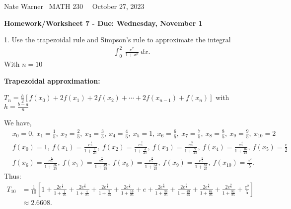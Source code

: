 \documentclass{report}
\title{\Huge{}}
\author{\huge{Nathan Warner}}
\date{\huge{}}
\begin{document}
    \pagebreak \bigbreak \noindent
    Nate Warner \ \quad \quad \quad \quad \quad \quad \quad \quad \quad \quad \quad \quad \quad \quad \quad \quad \quad  MATH 230 \quad  \quad \quad \quad \quad \quad \quad \quad \quad \ \ \quad \quad October 27, 2023
    \begin{center}
        \textbf{Homework/Worksheet 7 - Due: Wednesday, November 1}
    \end{center}
    \bigbreak \noindent 
    \begin{mdframed}
        1.  Use the trapezoidal rule and Simpson’s rule to approximate the integral
        \begin{align*}
            &\int_{0}^{2}\ \frac{e^{x}}{1+x^{2}}\ dx 
        .\end{align*}
        With $n=10$
    \end{mdframed}
    \bigbreak \noindent 
    \textbf{Trapezoidal approximation:}
    \begin{remark}
        $T_{n} = \frac{h}{2}\left[f(x_{0}) + 2f(x_{1}) + 2f(x_{2}) + \cdots + 2f(x_{n-1}) + f(x_{n})\right] $ with $h = \frac{b-a}{n}$
    \end{remark}
    \bigbreak \noindent 
    We have,
    \begin{align*}
        &x_{0} = 0,\ x_{1} = \frac{1}{5},\ x_{2}=\frac{2}{5},\ x_{3} = \frac{3}{5},\ x_{4} = \frac{4}{5},\ x_{5} = 1,\ x_{6} = \frac{6}{5},\ x_{7} = \frac{7}{5},\ x_{8} = \frac{8}{5},\ x_{9} = \frac{9}{5},\ x_{10} = 2 \\
        &f(x_{0}) = 1,\ f(x_{1}) = \frac{e^{\frac{1}{5}}}{1+\frac{1}{25}},\ f(x_{2}) = \frac{e^{\frac{2}{5}}}{1+\frac{4}{25}},\ f(x_{3}) = \frac{e^{\frac{3}{5}}}{1+\frac{9}{25}},\ f(x_{4}) = \frac{e^{\frac{4}{5}}}{1+\frac{16}{25}},\ f(x_{5}) = \frac{e}{2} \\
        &f(x_{6}) = \frac{e^{\frac{6}{5}}}{1+\frac{36}{25}},\ f(x_{7}) = \frac{e^{\frac{7}{5}}}{1+\frac{49}{25}},\ f(x_{8}) = \frac{e^{\frac{8}{5}}}{1+\frac{64}{25}},\ f(x_{9}) = \frac{e^{\frac{9}{5}}}{1+\frac{81}{25}},\ f(x_{10}) = \frac{e^{2}}{5}
    .\end{align*}
    \bigbreak \noindent 
    Thus:
    \begin{align*}
        T_{10} &= \frac{1}{10}\left[1 + \frac{2e^{\frac{1}{5}}}{1+\frac{1}{25}} + \frac{2e^{\frac{2}{5}}}{1+\frac{4}{25}} + \frac{2e^{\frac{3}{5}}}{1+\frac{9}{25}} + \frac{2e^{\frac{4}{5}}}{1+\frac{16}{25}} + e+ \frac{2e^{\frac{6}{5}}}{1+\frac{36}{25}} + \frac{2e^{\frac{7}{5}}}{1+\frac{49}{25}} + \frac{2e^{\frac{8}{5}}}{1+\frac{64}{25}} + \frac{2e^{\frac{9}{5}}}{1+\frac{81}{25}} + \frac{e^{2}}{5}\right] \\
             &\approx 2.6608
    .\end{align*}
\end{document}
